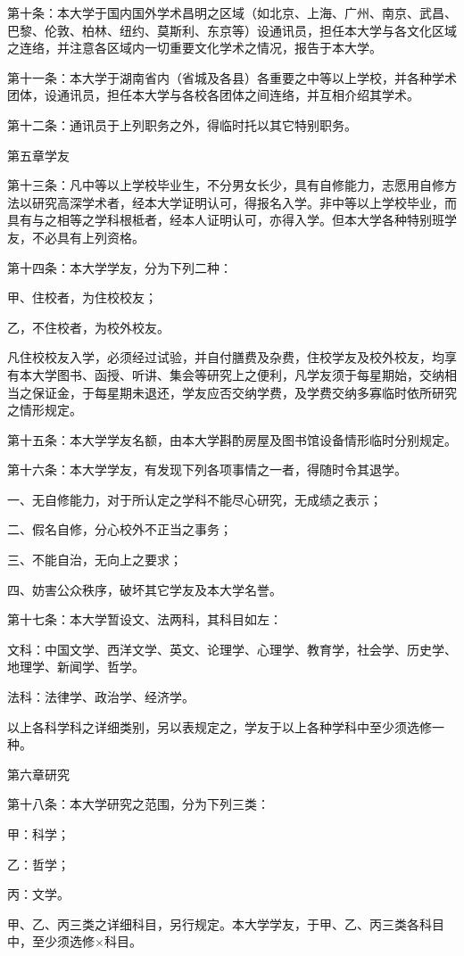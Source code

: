 第十条：本大学于国内国外学术昌明之区域（如北京、上海、广州、南京、武昌、巴黎、伦敦、柏林、纽约、莫斯利、东京等）设通讯员，担任本大学与各文化区域之连络，并注意各区域内一切重要文化学术之情况，报告于本大学。

第十一条：本大学于湖南省内（省城及各县）各重要之中等以上学校，并各种学术团体，设通讯员，担任本大学与各校各团体之间连络，并互相介绍其学术。

第十二条：通讯员于上列职务之外，得临时托以其它特别职务。

第五章学友

第十三条：凡中等以上学校毕业生，不分男女长少，具有自修能力，志愿用自修方法以研究高深学术者，经本大学证明认可，得报名入学。非中等以上学校毕业，而具有与之相等之学科根柢者，经本人证明认可，亦得入学。但本大学各种特别班学友，不必具有上列资格。

第十四条：本大学学友，分为下列二种：

甲、住校者，为住校校友；

乙，不住校者，为校外校友。

凡住校校友入学，必须经过试验，并自付膳费及杂费，住校学友及校外校友，均享有本大学图书、函授、听讲、集会等研究上之便利，凡学友须于每星期始，交纳相当之保证金，于每星期未退还，学友应否交纳学费，及学费交纳多寡临时依所研究之情形规定。

第十五条：本大学学友名额，由本大学斟酌房屋及图书馆设备情形临时分别规定。

第十六条：本大学学友，有发现下列各项事情之一者，得随时令其退学。

一、无自修能力，对于所认定之学科不能尽心研究，无成绩之表示；

二、假名自修，分心校外不正当之事务；

三、不能自治，无向上之要求；

四、妨害公众秩序，破坏其它学友及本大学名誉。

第十七条：本大学暂设文、法两科，其科目如左：

文科：中国文学、西洋文学、英文、论理学、心理学、教育学，社会学、历史学、地理学、新闻学、哲学。

法科：法律学、政治学、经济学。

以上各科学科之详细类别，另以表规定之，学友于以上各种学科中至少须选修一种。

第六章研究

第十八条：本大学研究之范围，分为下列三类：

甲：科学；

乙：哲学；

丙：文学。

甲、乙、丙三类之详细科目，另行规定。本大学学友，于甲、乙、丙三类各科目中，至少须选修×科目。

